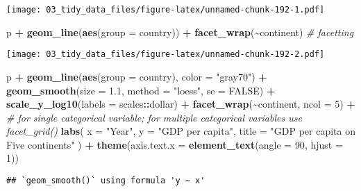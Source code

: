\documentclass[
]{book}
\newenvironment{Shaded}{\begin{snugshade}}{\end{snugshade}}
\newcommand{\CommentTok}[1]{\textcolor[rgb]{0.56,0.35,0.01}{\textit{#1}}}
\newcommand{\DataTypeTok}[1]{\textcolor[rgb]{0.13,0.29,0.53}{#1}}
\newcommand{\DecValTok}[1]{\textcolor[rgb]{0.00,0.00,0.81}{#1}}
\newcommand{\FloatTok}[1]{\textcolor[rgb]{0.00,0.00,0.81}{#1}}
\newcommand{\KeywordTok}[1]{\textcolor[rgb]{0.13,0.29,0.53}{\textbf{#1}}}
\newcommand{\NormalTok}[1]{#1}
\newcommand{\OperatorTok}[1]{\textcolor[rgb]{0.81,0.36,0.00}{\textbf{#1}}}
\newcommand{\OtherTok}[1]{\textcolor[rgb]{0.56,0.35,0.01}{#1}}
\newcommand{\StringTok}[1]{\textcolor[rgb]{0.31,0.60,0.02}{#1}}
\begin{document}
\texttt{[image: 03\_tidy\_data\_files/figure-latex/unnamed-chunk-192-1.pdf]}

\begin{Shaded}
\begin{Highlighting}[]
\NormalTok{p }\OperatorTok{+}\StringTok{ }\KeywordTok{geom\_line}\NormalTok{(}\KeywordTok{aes}\NormalTok{(}\DataTypeTok{group =}\NormalTok{ country)) }\OperatorTok{+}\StringTok{ }\KeywordTok{facet\_wrap}\NormalTok{(}\OperatorTok{\textasciitilde{}}\NormalTok{continent) }\CommentTok{\# facetting}
\end{Highlighting}
\end{Shaded}

\texttt{[image: 03\_tidy\_data\_files/figure-latex/unnamed-chunk-192-2.pdf]}

\begin{Shaded}
\begin{Highlighting}[]
\NormalTok{p }\OperatorTok{+}\StringTok{ }\KeywordTok{geom\_line}\NormalTok{(}\KeywordTok{aes}\NormalTok{(}\DataTypeTok{group =}\NormalTok{ country), }\DataTypeTok{color =} \StringTok{"gray70"}\NormalTok{) }\OperatorTok{+}
\StringTok{  }\KeywordTok{geom\_smooth}\NormalTok{(}\DataTypeTok{size =} \FloatTok{1.1}\NormalTok{, }\DataTypeTok{method =} \StringTok{"loess"}\NormalTok{, }\DataTypeTok{se =} \OtherTok{FALSE}\NormalTok{) }\OperatorTok{+}
\StringTok{  }\KeywordTok{scale\_y\_log10}\NormalTok{(}\DataTypeTok{labels =}\NormalTok{ scales}\OperatorTok{::}\NormalTok{dollar) }\OperatorTok{+}
\StringTok{  }\KeywordTok{facet\_wrap}\NormalTok{(}\OperatorTok{\textasciitilde{}}\NormalTok{continent, }\DataTypeTok{ncol =} \DecValTok{5}\NormalTok{) }\OperatorTok{+}\StringTok{ }\CommentTok{\# for single categorical variable; for multiple categorical variables use facet\_grid()}
\StringTok{  }\KeywordTok{labs}\NormalTok{(}
    \DataTypeTok{x =} \StringTok{"Year"}\NormalTok{,}
    \DataTypeTok{y =} \StringTok{"GDP per capita"}\NormalTok{,}
    \DataTypeTok{title =} \StringTok{"GDP per capita on Five continents"}
\NormalTok{  ) }\OperatorTok{+}
\StringTok{  }\KeywordTok{theme}\NormalTok{(}\DataTypeTok{axis.text.x =} \KeywordTok{element\_text}\NormalTok{(}\DataTypeTok{angle =} \DecValTok{90}\NormalTok{, }\DataTypeTok{hjust =} \DecValTok{1}\NormalTok{))}
\end{Highlighting}
\end{Shaded}

\begin{verbatim}
## `geom_smooth()` using formula 'y ~ x'
\end{verbatim}
\end{document}

